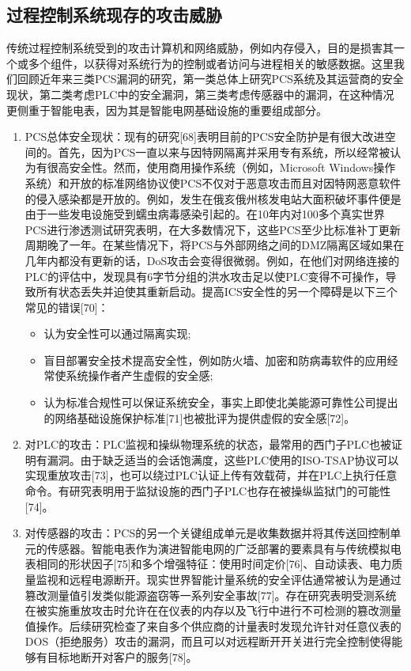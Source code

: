 \subsection{过程控制系统现存的攻击威胁}

传统过程控制系统受到的攻击计算机和网络威胁，例如内存侵入，目的是损害其一个或多个组件，以获得对系统行为的控制或者访问与进程相关的敏感数据。这里我们回顾近年来三类PCS漏洞的研究，第一类总体上研究PCS系统及其运营商的安全现状，第二类考虑PLC中的安全漏洞，第三类考虑传感器中的漏洞，在这种情况更侧重于智能电表，因为其是智能电网基础设施的重要组成部分。 

\begin{enumerate}
\item PCS总体安全现状：现有的研究[68]表明目前的PCS安全防护是有很大改进空间的。首先，因为PCS一直以来与因特网隔离并采用专有系统，所以经常被认为有很高安全性。然而，使用商用操作系统（例如，Microsoft Windows操作系统）和开放的标准网络协议使PCS不仅对于恶意攻击而且对因特网恶意软件的侵入感染都是开放的。例如，发生在俄亥俄州核发电站大面积破坏事件便是由于一些发电设施受到蠕虫病毒感染引起的。在10年内对100多个真实世界PCS进行渗透测试研究表明，在大多数情况下，这些PCS至少比标准补丁更新周期晚了一年。在某些情况下，将PCS与外部网络之间的DMZ隔离区域如果在几年内都没有更新的话，DoS攻击会变得很微弱。例如，在他们对网络连接的PLC的评估中，发现具有6字节分组的洪水攻击足以使PLC变得不可操作，导致所有状态丢失并迫使其重新启动。提高ICS安全性的另一个障碍是以下三个常见的错误[70]：
\begin{itemize}
\item 认为安全性可以通过隔离实现; 
\item 盲目部署安全技术提高安全性，例如防火墙、加密和防病毒软件的应用经常使系统操作者产生虚假的安全感;
\item 认为标准合规性可以保证系统安全，事实上即使北美能源可靠性公司提出的网络基础设施保护标准[71]也被批评为提供虚假的安全感[72]。 
\end{itemize}
\item 对PLC的攻击：PLC监视和操纵物理系统的状态，最常用的西门子PLC也被证明有漏洞。由于缺乏适当的会话饱满度，这些PLC使用的ISO-TSAP协议可以实现重放攻击[73]，也可以绕过PLC认证上传有效载荷，并在PLC上执行任意命令。有研究表明用于监狱设施的西门子PLC也存在被操纵监狱门的可能性[74]。 
\item 对传感器的攻击：PCS的另一个关键组成单元是收集数据并将其传送回控制单元的传感器。智能电表作为演进智能电网的广泛部署的要素具有与传统模拟电表相同的形状因子[75]和多个增强特征：使用时间定价[76]、自动读表、电力质量监视和远程电源断开。现实世界智能计量系统的安全评估通常被认为是通过篡改测量值引发类似能源盗窃等一系列安全事故[77]。存在研究表明受测系统在被实施重放攻击时允许在在仪表的内存以及飞行中进行不可检测的篡改测量值操作。后续研究检查了来自多个供应商的计量表时发现允许针对任意仪表的DOS（拒绝服务）攻击的漏洞，而且可以对远程断开开关进行完全控制使得能够有目标地断开对客户的服务[78]。
\end{enumerate}


